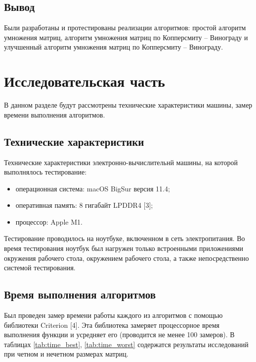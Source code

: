\pagebreak

\subsection{Вывод}

Были разработаны и протестированы реализации алгоритмов: простой алгоритм умножения матриц, алгоритм умножения матриц по Копперсмиту – Винограду и улучшенный алгоритм умножения матриц по Копперсмиту – Винограду.

\section{Исследовательская часть}

В данном разделе будут рассмотрены технические характеристики машины, замер времени выполнения алгоритмов.

\subsection{Технические характеристики}

Технические характеристики электронно-вычислительнй машины, на которой выполнялось тестирование:

\begin{itemize}
    \item операционная система: macOS BigSur версия 11.4;
    \item оперативная память: 8 гигабайт LPDDR4 [3];
    \item процессор: Apple M1.
\end{itemize}


Тестирование проводилось на ноутбуке, включенном в сеть электропитания. Во время тестирования ноутбук был нагружен только встроенными приложениями окружения рабочего стола, окружением рабочего стола, а также непосредственно системой тестирования.

\subsection{Время выполнения алгоритмов}

Был проведен замер времени работы каждого из алгоритмов с помощью библиотеки Criterion [4]. Эта библиотека замеряет процессорное время выполнения функции и усредняет его (проводится не менее 100 замеров). В таблицах \ref{tab:time_best}, \ref{tab:time_worst} содержатся результаты исследований при четном и нечетном размерах матриц.

